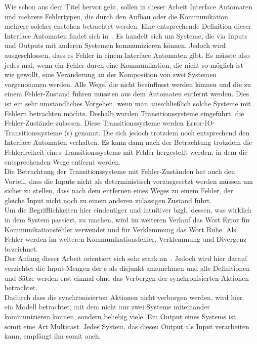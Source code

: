 Wie schon aus dem Titel hervor geht, sollen in dieser Arbeit Interface
Automaten und mehrere Fehlertypen, die durch den Aufbau oder die Kommunikation mehrere solcher enstehen
betrachtet werden. Eine entsprechende Definition dieser Interface Automaten
findet sich in~\cite{Alfaro2004}. Es handelt sich um Systeme, die via
Inputs und Outputs mit anderen Systemen kommunizieren können. Jedoch wird
ausgeschlossen, dass es Fehler in einem Interface Automaten gibt. Es müsste
also jedes mal, wenn ein Fehler durch eine Kommunikation, die nicht so möglich
ist wie gewollt, eine Veränderung an der Komposition von zwei Systemen
vorgenommen werden. Alle Wege, die nicht beeinflusst werden
können und die zu einem Fehler-Zustand führen müssten aus dem Automaten
entfernt werden. Dies ist ein sehr umständliches Vorgehen, wenn man
ausschließlich solche Systeme mit Fehlern betrachten möchte. Deshalb wurden
Transitionssysteme eingeführt, die Fehler-Zustände zulassen. Diese
Transitionssysteme werden Error-IO-Transitionssysteme (\EIO{}s) genannt. Die sich jedoch
trotzdem noch entsprechend den Interface Automaten verhalten. Es kann dann nach
der Betrachtung trotzdem die Fehlerfreiheit eines Transitionssystems mit Fehler
hergestellt werden, in dem die entsprechenden Wege entfernt werden.\\
Die Betrachtung der Transitionssysteme mit Fehler-Zuständen hat auch den
Vorteil, dass die Inputs nicht als deterministisch vorausgesetzt werden müssen
um sicher zu stellen, dass nach dem entfernen eines Weges zu einem Fehler, der
gleiche Input nicht noch zu einem anderen zulässigen Zustand führt.\\
Um die Begrifflichkeiten hier eindeutiger und intuitiver bzgl.\ dessen, was
wirklich in dem System passiert, zu machen, wird im weiteren Verlauf
das Wort Error für Kommunikationsfehler verwendet und für Verklemmung das Wort
Ruhe. Als Fehler werden im weiteren Kommunikationsfehler, Verklemmung und
Divergenz bezeichnet.\\
Der Anfang dieser Arbeit orientiert sich sehr stark an~\cite{Vogler2014EIO}.
Jedoch wird hier darauf verzichtet die Input-Mengen der \EIO{}s als disjunkt anzunehmen und alle
Definitionen und Sätze werden erst einmal ohne das Verbergen der
synchronisierten Aktionen betrachtet.\\
Dadurch dass die synchronisierten Aktionen nicht verborgen werden, wird hier
ein Modell betrachtet, mit dem nicht nur zwei Systeme miteinander kommunizieren können,
sondern beliebig viele. Ein Output eines Systems ist somit eine Art Multicast.
Jedes System, das diesen Output als Input verarbeiten kann, empfängt ihn somit auch,

